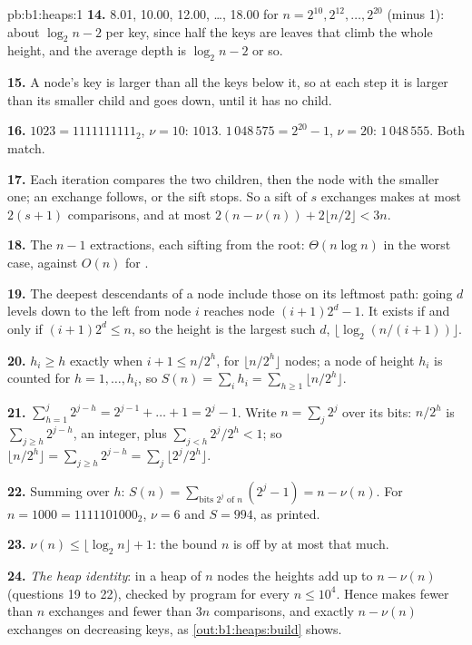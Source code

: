 \begin{solution}{pb:b1:heaps:1}
\textbf{14.} 8.01, 10.00, 12.00, \dots, 18.00 for $n = 2^{10}, 2^{12}, \dots, 2^{20}$ (minus 1): about $\log_2 n - 2$ per
key, since half the keys are leaves that climb the whole height, and the average depth is $\log_2 n - 2$ or so.

\textbf{15.} A node's key is larger than all the keys below it, so at each step it is larger than its smaller child and
goes down, until it has no child.

\textbf{16.} $1023 = 1111111111_2$, $\nu = 10$: $1013$. $1\,048\,575 = 2^{20} - 1$, $\nu = 20$: $1\,048\,555$. Both
match.

\textbf{17.} Each iteration compares the two children, then the node with the smaller one; an exchange follows, or the
sift stops. So a sift of $s$ exchanges makes at most $2(s + 1)$ comparisons, and  at most $2(n - \nu(n)) + 2
\lfloor n/2 \rfloor < 3n$.

\textbf{18.} The $n - 1$ extractions, each sifting from the root: $\Theta(n \log n)$ in the worst case, against $O(n)$ for
.

\textbf{19.} The deepest descendants of a node include those on its leftmost path: going $d$ levels down to the left from
node $i$ reaches node $(i + 1)2^d - 1$. It exists if and only if $(i + 1)2^d \leq n$, so the height is the largest such
$d$, $\lfloor \log_2 (n/(i + 1)) \rfloor$.

\textbf{20.} $h_i \geq h$ exactly when $i + 1 \leq n/2^h$, for $\lfloor n/2^h \rfloor$ nodes; a node of height $h_i$ is
counted for $h = 1, \dots, h_i$, so $S(n) = \sum_i h_i = \sum_{h \geq 1} \lfloor n/2^h \rfloor$.

\textbf{21.} $\sum_{h=1}^{j} 2^{j-h} = 2^{j-1} + \dots + 1 = 2^j - 1$. Write $n = \sum_j 2^j$ over its bits: $n/2^h$ is
$\sum_{j \geq h} 2^{j-h}$, an integer, plus $\sum_{j < h} 2^j/2^h < 1$; so $\lfloor n/2^h \rfloor = \sum_{j \geq h}
2^{j-h} = \sum_j \lfloor 2^j/2^h \rfloor$.

\textbf{22.} Summing over $h$: $S(n) = \sum_{\text{bits } 2^j \text{ of } n} (2^j - 1) = n - \nu(n)$. For $n = 1000 =
1111101000_2$, $\nu = 6$ and $S = 994$, as printed.

\textbf{23.} $\nu(n) \leq \lfloor \log_2 n \rfloor + 1$: the bound $n$ is off by at most that much.

\textbf{24.} \emph{The heap identity}: in a heap of $n$ nodes the heights add up to $n - \nu(n)$ (questions 19 to 22),
checked by program for every $n \leq 10^4$. Hence  makes fewer than $n$ exchanges and fewer than $3n$ comparisons,
and exactly $n - \nu(n)$ exchanges on decreasing keys, as \cref{out:b1:heaps:build} shows.
\end{solution}
